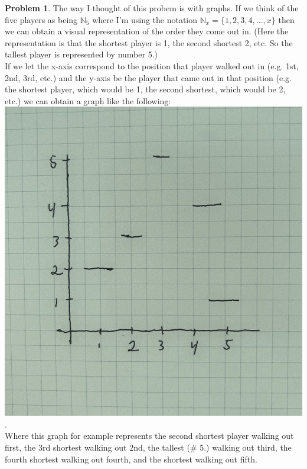 \documentclass{article}
\theoremstyle{definition}
\newtheorem{problem}{Problem}
\begin{document}
\begin{problem}
The way I thought of this probem is with graphs. If we think of the five players as being $\mathbb{N}_5$ where I'm using the notation
$\mathbb{N}_x = \{1,2,3,4,...,x\}$ then we can obtain a visual representation of the order they come out in. (Here the representation is that the shortest player is 1, the second shortest 2, etc. So the tallest player is represented by number 5.)\\

If we let the x-axis correspond to the position that player walked out in (e.g. 1st, 2nd, 3rd, etc.) and the y-axis be the player that came out in that position
(e.g. the shortest player, which would be 1, the second shortest, which would be 2, etc.) we can obtain a graph like the following:\\

\includegraphics[scale = 0.1]{./Figures/IMG_0478.jpg}.\\

Where this graph for example represents the second shortest player walking out first, the 3rd shortest walking out 2nd, the tallest (\# 5.) walking out third, the fourth shortest walking out fourth, and the shortest walking out fifth.\\


\end{problem}
\end{document}
